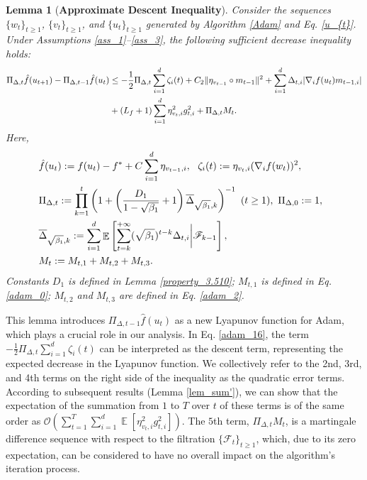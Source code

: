 \documentclass{article} %
\newtheorem{lemma}{Lemma}[section]
\DeclareMathOperator{\Expect}{\mathbb{E}}
\begin{document}
\begin{lemma}[\textbf{Approximate Descent Inequality}]\label{sufficient:decrease}
Consider the sequences \(\{w_{t}\}_{t\ge 1}\), \(\{v_{t}\}_{t\ge 1}\), and \(\{u_{t}\}_{t\ge 1}\) generated by Algorithm \ref{Adam} and Eq. \ref{u_{t}}. Under Assumptions \ref{ass_1}--\ref{ass_3}, the following sufficient decrease inequality holds:
\begin{align}\label{adam_16}
\Pi_{\Delta,t}\hat{f}(u_{t+1})-\Pi_{\Delta,t-1}\hat{f}(u_{t})&\le-\frac{1}{2}\Pi_{\Delta,t}\sum_{i=1}^{d}\zeta_{i}(t)\notag+C_{2}\|{\eta_{v_{t-1}}}\circ m_{t-1}\|^{2}+\sum_{i=1}^{d}\Delta_{t,i}|\nabla_{i} f(u_{t})m_{t-1,i}|\\&+(L_{f}+1)\sum_{i=1}^{d}\eta_{v_{t},i}^{2}g_{t,i}^{2}+\Pi_{\Delta,t}M_{t}.
\end{align}
Here,
\begin{align}\label{Delta}
&\hat{f}(u_{t}):=f(u_{t})-f^*+C\sum_{i=1}^{d}\eta_{v_{t-1},i},\notag\ \ \zeta_{i}(t):=\eta_{v_{t},i}(\nabla_{i}f(w_{t}))^{2},\notag\\
&\Pi_{\Delta,t}:=\prod_{k=1}^{t}\left(1+\left(\frac{D_1}{1-\sqrt{\beta_{1}}}+1\right)\overline{\Delta}_{\sqrt{\beta_{1}},k}\right)^{-1}\ (t\ge 1),\ \Pi_{\Delta,0}:=1,\notag\ \   \\&\overline{\Delta}_{\sqrt{\beta_{1}},k} := \sum_{i=1}^{d}\Expect\left[\sum_{t=k}^{+\infty} (\sqrt{\beta_{1}})^{t-k} \Delta_{t,i}\bigg|\mathscr{F}_{k-1}\right],\notag\\
&M_{t}:=M_{t,1}+M_{t,2}+M_{t,3}.
\end{align}
Constants \( D_{1} \) is defined in Lemma \ref{property_3.510}; \( M_{t,1} \) is defined in Eq. \ref{adam_0}; \( M_{t,2} \) and \( M_{t,3} \) are defined in Eq. \ref{adam_2}.
\end{lemma}

This lemma introduces \( \Pi_{\Delta,t-1}\hat{f}(u_{t}) \) as a new Lyapunov function for Adam, which plays a crucial role in our analysis. In Eq. \ref{adam_16}, the term \( -\frac{1}{2}\Pi_{\Delta,t}\sum_{i=1}^{d}\zeta_{i}(t) \) can be interpreted as the descent term, representing the expected decrease in the Lyapunov function. We collectively refer to the 2nd, 3rd, and 4th terms on the right side of the inequality as the quadratic error terms. According to subsequent results (Lemma \ref{lem_sum'}), we can show that the expectation of the summation from \(1\) to \(T\) over \(t\) of these terms is of the same order as \(\mathcal{O}\left(\sum_{t=1}^{T} \sum_{i=1}^{d} \Expect\left[\eta_{v_{t},i}^{2} g_{t,i}^{2}\right]\right).\) The $5$th term, \( \Pi_{\Delta,t}M_{t} \), is a martingale difference sequence with respect to the filtration \( \{\mathscr{F}_{t}\}_{t\ge 1} \), which, due to its zero expectation, can be considered to have no overall impact on the algorithm's iteration process.
\end{document}
